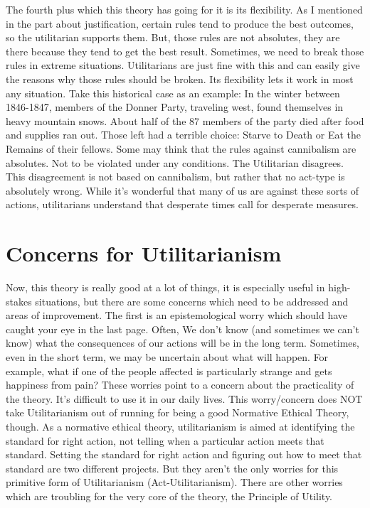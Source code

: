 The fourth plus which this theory has going for it is its flexibility. As I mentioned in the part about justification, certain rules tend to produce the best outcomes, so the utilitarian supports them. But, those rules are not absolutes, they are there because they tend to get the best result. Sometimes, we need to break those rules in extreme situations. Utilitarians are just fine with this and can easily give the reasons why those rules should be broken. Its flexibility lets it work in most any situation. Take this historical case as an example: In the winter between 1846-1847, members of the Donner Party, traveling west, found themselves in heavy mountain snows. About half of the 87 members of the party died after food and supplies ran out. Those left had a terrible choice: Starve to Death or Eat the Remains of their fellows. Some may think that the rules against cannibalism are absolutes. Not to be violated under any conditions. The Utilitarian disagrees. This disagreement is not based on cannibalism, but rather that no act-type is absolutely wrong. While it’s wonderful that many of us are against these sorts of actions, utilitarians understand that desperate times call for desperate measures.

\section{Concerns for Utilitarianism}

Now, this theory is really good at a lot of things, it is especially useful in high-stakes situations, but there are some concerns which need to be addressed and areas of improvement. The first is an epistemological worry which should have caught your eye in the last page. Often, We don’t know (and sometimes we can't know) what the consequences of our actions will be in the long term. Sometimes, even in the short term, we may be uncertain about what will happen. For example, what if one of the people affected is particularly strange and gets happiness from pain? These worries point to a concern about the practicality of the theory.  It's difficult to use it in our daily lives. This worry/concern does NOT take Utilitarianism out of running for being a good Normative Ethical Theory, though. As a normative ethical theory, utilitarianism is aimed at identifying the standard for right action, not telling when a particular action meets that standard. Setting the standard for right action and figuring out how to meet that standard are two different projects. But they aren't the only worries for this primitive form of Utilitarianism (Act-Utilitarianism). There are other worries which are troubling for the very core of the theory, the Principle of Utility.
